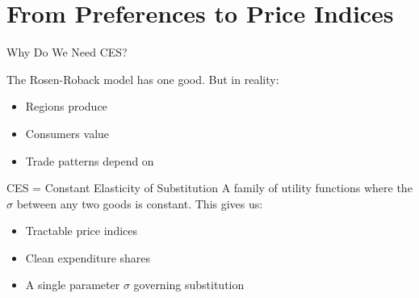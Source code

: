 \documentclass{beamer}
\begin{document}

\section{From Preferences to Price Indices}

\begin{frame}{Why Do We Need CES?}

    The Rosen-Roback model has one good. But in reality:
    \begin{itemize}
        \item Regions produce 
        \item Consumers value 
        \item Trade patterns depend on 
    \end{itemize}

    \vspace{0.5em}
    \begin{exampleblock}{CES = Constant Elasticity of Substitution}
        A family of utility functions where the  $\sigma$ between any two goods is constant. This gives us:
        \begin{itemize}
            \item Tractable price indices
            \item Clean expenditure shares
            \item A single parameter $\sigma$ governing substitution
        \end{itemize}
    \end{exampleblock}

\end{frame}
\end{document}
